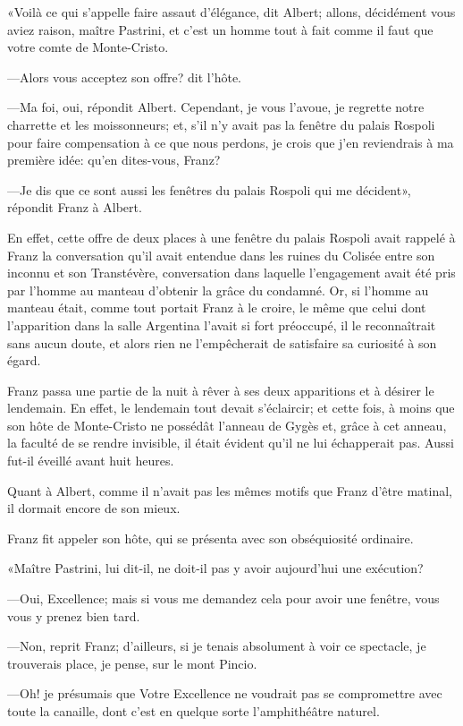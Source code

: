«Voilà ce qui s'appelle faire assaut d'élégance, dit Albert; allons, décidément vous aviez raison, maître Pastrini, et c'est un homme tout à fait comme il faut que votre comte de Monte-Cristo. 

—Alors vous acceptez son offre? dit l'hôte. 

—Ma foi, oui, répondit Albert. Cependant, je vous l'avoue, je regrette notre charrette et les moissonneurs; et, s'il n'y avait pas la fenêtre du palais Rospoli pour faire compensation à ce que nous perdons, je crois que j'en reviendrais à ma première idée: qu'en dites-vous, Franz? 

—Je dis que ce sont aussi les fenêtres du palais Rospoli qui me décident», répondit Franz à Albert. 

En effet, cette offre de deux places à une fenêtre du palais Rospoli avait rappelé à Franz la conversation qu'il avait entendue dans les ruines du Colisée entre son inconnu et son Transtévère, conversation dans laquelle l'engagement avait été pris par l'homme au manteau d'obtenir la grâce du condamné. Or, si l'homme au manteau était, comme tout portait Franz à le croire, le même que celui dont l'apparition dans la salle Argentina l'avait si fort préoccupé, il le reconnaîtrait sans aucun doute, et alors rien ne l'empêcherait de satisfaire sa curiosité à son égard. 

Franz passa une partie de la nuit à rêver à ses deux apparitions et à désirer le lendemain. En effet, le lendemain tout devait s'éclaircir; et cette fois, à moins que son hôte de Monte-Cristo ne possédât l'anneau de Gygès et, grâce à cet anneau, la faculté de se rendre invisible, il était évident qu'il ne lui échapperait pas. Aussi fut-il éveillé avant huit heures. 

Quant à Albert, comme il n'avait pas les mêmes motifs que Franz d'être matinal, il dormait encore de son mieux. 

Franz fit appeler son hôte, qui se présenta avec son obséquiosité ordinaire. 

«Maître Pastrini, lui dit-il, ne doit-il pas y avoir aujourd'hui une exécution? 

—Oui, Excellence; mais si vous me demandez cela pour avoir une fenêtre, vous vous y prenez bien tard. 

—Non, reprit Franz; d'ailleurs, si je tenais absolument à voir ce spectacle, je trouverais place, je pense, sur le mont Pincio. 

—Oh! je présumais que Votre Excellence ne voudrait pas se compromettre avec toute la canaille, dont c'est en quelque sorte l'amphithéâtre naturel. 

